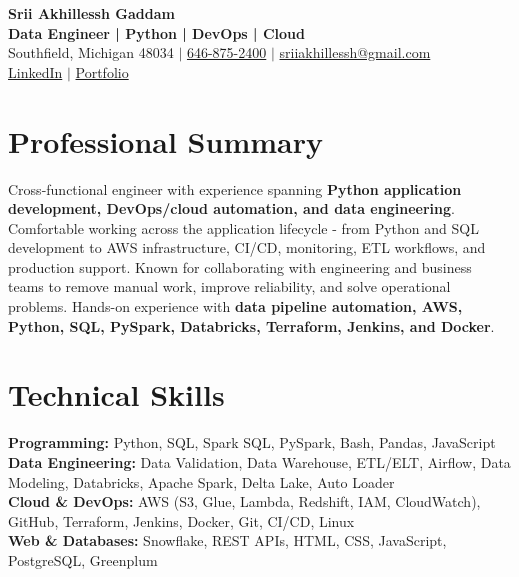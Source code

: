 \documentclass[letterpaper,10pt]{article}
\begin{document}
\fontsize{9.35pt}{10.45pt}\selectfont

\begin{center}
    {\LARGE \textbf{Srii Akhillessh Gaddam}} \\[-1pt]
    \textbf{Data Engineer | Python | DevOps | Cloud} \\[2pt]
    Southfield, Michigan 48034 $|$
    \href{tel:6468752400}{646-875-2400} $|$
    \href{mailto:sriiakhillessh@gmail.com}{sriiakhillessh@gmail.com} \\[1pt]
    \href{https://www.linkedin.com/in/srii-akhiilessh-gaddam-b48668191/}{LinkedIn} $|$
    \href{https://sriiakhillesshg.github.io/portfolio/}{Portfolio}
\end{center}
\vspace{-8pt}

\section{Professional Summary}
\small{Cross-functional engineer with experience spanning \textbf{Python application development, DevOps/cloud automation, and data engineering}. Comfortable working across the application lifecycle - from Python and SQL development to AWS infrastructure, CI/CD, monitoring, ETL workflows, and production support. Known for collaborating with engineering and business teams to remove manual work, improve reliability, and solve operational problems. Hands-on experience with \textbf{data pipeline automation, AWS, Python, SQL, PySpark, Databricks, Terraform, Jenkins, and Docker}.}

\section{Technical Skills}
\small{
\textbf{Programming:} Python, SQL, Spark SQL, PySpark, Bash, Pandas, JavaScript \\
\textbf{Data Engineering:} Data Validation, Data Warehouse, ETL/ELT, Airflow, Data Modeling, Databricks, Apache Spark, Delta Lake, Auto Loader \\
\textbf{Cloud \& DevOps:} AWS (S3, Glue, Lambda, Redshift, IAM, CloudWatch), GitHub, Terraform, Jenkins, Docker, Git, CI/CD, Linux \\
\textbf{Web \& Databases:} Snowflake, REST APIs, HTML, CSS, JavaScript, PostgreSQL, Greenplum
}
\end{document}
